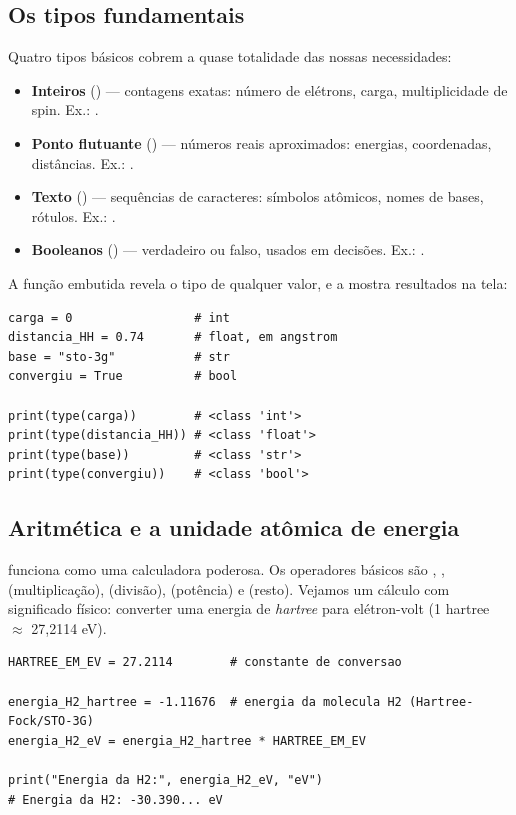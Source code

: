 \subsection{Os tipos fundamentais}

Quatro tipos básicos cobrem a quase totalidade das nossas necessidades:

\begin{itemize}[leftmargin=*]
  \item \textbf{Inteiros} () --- contagens exatas: número de elétrons,
        carga, multiplicidade de spin. Ex.: .
  \item \textbf{Ponto flutuante} () --- números reais aproximados:
        energias, coordenadas, distâncias. Ex.: .
  \item \textbf{Texto} () --- sequências de caracteres: símbolos
        atômicos, nomes de bases, rótulos. Ex.: .
  \item \textbf{Booleanos} () --- verdadeiro ou falso, usados em
        decisões. Ex.: .
\end{itemize}

A função embutida  revela o tipo de qualquer valor, e a 
mostra resultados na tela:

\begin{lstlisting}[style=python,caption={Inspecionando tipos com \code{type()}.}]
carga = 0                 # int
distancia_HH = 0.74       # float, em angstrom
base = "sto-3g"           # str
convergiu = True          # bool

print(type(carga))        # <class 'int'>
print(type(distancia_HH)) # <class 'float'>
print(type(base))         # <class 'str'>
print(type(convergiu))    # <class 'bool'>
\end{lstlisting}

\subsection{Aritmética e a unidade atômica de energia}

\python{} funciona como uma calculadora poderosa. Os operadores básicos são
\code{+}, \code{-}, \code{*} (multiplicação), \code{/} (divisão), \code{**} (potência) e
\code{\%} (resto). Vejamos um cálculo com significado físico: converter uma energia
de \emph{hartree} para elétron-volt (1 hartree $\approx$ 27{,}2114 eV).

\begin{lstlisting}[style=python,caption={Conversão de unidades de energia.},label={lst:conversao}]
HARTREE_EM_EV = 27.2114        # constante de conversao

energia_H2_hartree = -1.11676  # energia da molecula H2 (Hartree-Fock/STO-3G)
energia_H2_eV = energia_H2_hartree * HARTREE_EM_EV

print("Energia da H2:", energia_H2_eV, "eV")
# Energia da H2: -30.390... eV
\end{lstlisting}

